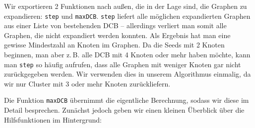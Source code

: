\documentclass[a4paper]{scrartcl}
\begin{document}
Wir exportieren 2 Funktionen nach außen, die in der Lage sind, die Graphen zu expandieren: \texttt{step} und \texttt{maxDCB}. \texttt{step} liefert alle möglichen expandierten Graphen aus einer Liste von bestehenden DCB -- allerdings verliert man somit alle Graphen, die nicht expandiert werden konnten. Als Ergebnis hat man eine gewisse Mindestzahl an Knoten im Graphen. Da die Seeds mit 2 Knoten beginnen, man aber z.\,B. alle DCB mit 4 Knoten oder mehr haben möchte, kann man \texttt{step} so häufig aufrufen, dass alle Graphen mit weniger Knoten gar nicht zurückgegeben werden. Wir verwenden dies in unserem Algorithmus einmalig, da wir nur Cluster mit 3 oder mehr Knoten zurückliefern.\par
\medskip
Die Funktion \texttt{maxDCB} übernimmt die eigentliche Berechnung, sodass wir diese im Detail besprechen. Zunächst jedoch geben wir einen kleinen Überblick über die Hilfsfunktionen im Hintergrund:
\end{document}
